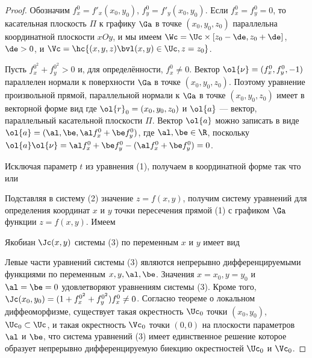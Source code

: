 \documentclass[a4paper]{article}
\begin{document}
\begin{proof}
Обозначим $f^0_x = f'_x(x_0,y_0)$, $f^0_y=f'_y(x_0,y_0)$. Если
$f^0_x=f^0_y=0$, то касательная плоскость $\Pi$ к графику $\Ga$ в
точке $(x_0,y_0,z_0)$ параллельна координатной плоскости $xOy$, и мы
имеем $\Wc=\Uc\times[z_0-\de,z_0+\de]$, $\de>0$, и
$\Vc=\hc{(x,y,z)\bvl(x,y)\in\Uc, z=z_0}$.

Пусть $f^{0^2}_x + f^{0^2}_y>0$ и, для определённости, $f^0_x\ne0$.
Вектор $\ol{\nu}=(f^0_x,f^0_y,-1)$ параллелен нормали к поверхности
$\Ga$ в точке $(x_0,y_0,z_0)$. Поэтому уравнение произвольной
прямой, параллельной нормали к $\Ga$ в точке $(x_0,y_0,z_0)$ имеет в
векторной форме вид  где $\ol{r}_0=(x_0,y_0,z_0)$
и $\ol{a}$ --- вектор, параллельный касательной плоскости $\Pi$.
Вектор $\ol{a}$ можно записать в виде $\ol{a}=(\al,\be,\al f^0_x+\be
f^0_y)$, где $\al,\be\in\R$, поскольку $\ol{a}\ol{\nu} = \al f^0_x +
\be f^0_y - (\al f^0_x + \be f^0_y)=0$.

Исключая параметр $t$ из уравнения (1), получаем в координатной
форме  так что  или

Подставляя в систему (2) значение $z=f(x,y)$, получим систему
уравнений для определения координат $x$ и $y$ точки пересечения
прямой (1) с графиком $\Ga$ функции $z=f(x,y)$. Имеем 

Якобиан $\Jc(x,y)$ системы (3) по переменным $x$ и $y$ имеет вид

Левые части уравнений системы (3) являются непрерывно
дифференцируемыми функциями по переменным $x,y,\al,\be$. Значения
$x=x_0,y=y_0$ и $\al=\be=0$ удовлетворяют уравнениям системы (3).
Кроме того, $\Jc(x_0,y_0)=(1+f^{0^2}_x + f^{0^2}_y)f^0_x\ne0$.
Согласно теореме о локальном диффеоморфизме, существует такая
окрестность $\Uc_0$ точки $(x_0,y_0)$, $\Uc_0\subset\Uc$, и такая
окрестность $\Vc_0$ точки $(0,0)$ на плоскости параметров $\al$ и
$\be$, что система уравнений (3) имеет единственное решение
 которое образует
непрерывно дифференцируемую биекцию окрестностей $\Uc_0$ и $\Vc_0$.


\end{proof}
\end{document}
